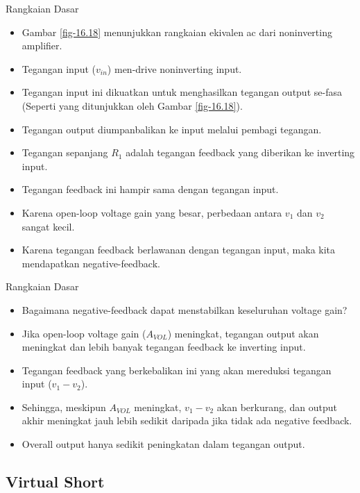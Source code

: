 \begin{frame}{Rangkaian Dasar}
	\begin{itemize}
		\item Gambar \ref{fig-16.18} menunjukkan rangkaian ekivalen ac dari noninverting amplifier.
		\item Tegangan input ($ v_{in} $) men-drive noninverting input.
		\item Tegangan input ini dikuatkan untuk menghasilkan tegangan output se-fasa (Seperti yang ditunjukkan oleh Gambar \ref{fig-16.18}).
		\item Tegangan output diumpanbalikan ke input melalui pembagi tegangan.
		\item Tegangan sepanjang $ R_1 $ adalah tegangan feedback yang diberikan ke inverting input.
		\item Tegangan feedback ini hampir sama dengan tegangan input.
		\item Karena open-loop voltage gain yang besar, perbedaan antara $ v_1 $ dan $ v_2 $ sangat kecil.
		\item Karena tegangan feedback berlawanan dengan tegangan input, maka kita mendapatkan negative-feedback.
	\end{itemize}
\end{frame}

\begin{frame}{Rangkaian Dasar}
	\begin{itemize}
		\item Bagaimana negative-feedback dapat menstabilkan keseluruhan voltage gain?
		\item Jika open-loop voltage gain ($ A_{VOL} $) meningkat, tegangan output akan meningkat dan lebih banyak tegangan feedback ke inverting input.
		\item Tegangan feedback yang berkebalikan ini yang akan mereduksi tegangan input ($ v_1 - v_2 $).
		\item Sehingga, meskipun $ A_{VOL} $ meningkat, $ v_1 - v_2 $ akan berkurang, dan output akhir meningkat jauh lebih sedikit daripada jika tidak ada negative feedback. 
		\item Overall output hanya sedikit peningkatan dalam tegangan output.
	\end{itemize}
\end{frame}



\subsection{Virtual Short}

